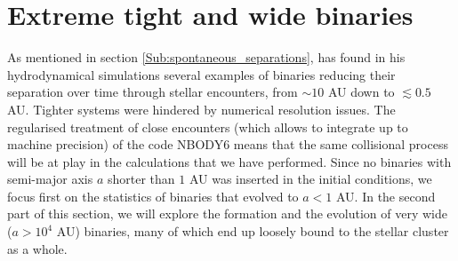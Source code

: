 %
% 
%
%
%
%

\section{Extreme tight and wide binaries}

As mentioned in section \ref{Sub:spontaneous_separations}, \cite{Bate2012} has found in his hydrodynamical simulations several examples of binaries reducing their separation over time through stellar encounters, from $\sim 10 $ AU down to $ \lesssim 0.5 $ AU. Tighter systems were hindered by numerical resolution issues. The regularised treatment of close encounters (which allows to integrate up to machine precision) of the code NBODY6 means that the same collisional process will be at play in the calculations that we have performed. Since no binaries with semi-major axis $a$  shorter than $ 1 $ AU was inserted in the initial conditions, we focus first on the statistics of binaries that evolved to $a < 1 $ AU. In the second part of this section, we will explore the formation and the evolution of very wide ($a > 10^4$ AU) binaries, many of which end up loosely bound to the stellar cluster  as a whole.   

